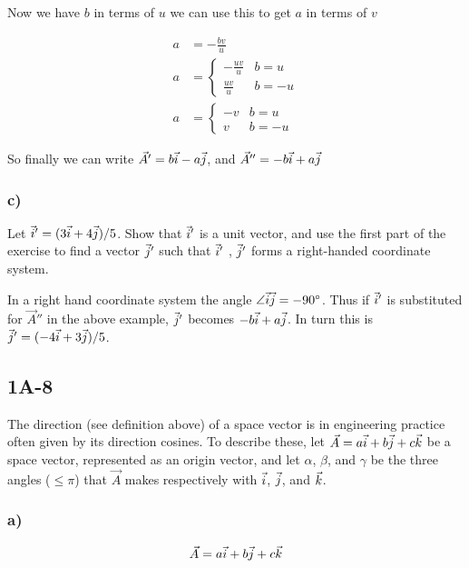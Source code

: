 Now we have $b$ in terms of $u$ we can use this to get $a$ in terms 
of $v$

\begin{align*}
a &= -\frac{bv}{u}\\
a &= \begin{cases} 
      -\frac{uv}{u} & b= u \\
      \frac{uv}{u} & b= -u
   \end{cases}\\
a &= \begin{cases} 
      -v & b= u \\
      v & b= -u
   \end{cases}
\end{align*}

So finally we can write $\vec{A}' = b\vec{i} - a\vec{j}$, and $\vec{A}'' = -b
\vec{i} + a\vec{j}$


\subsubsection*{c)} 
Let $\vec{i}' =(3\vec{i} +4\vec{j})/5$. Show that $\vec{i}'$ 
is a unit vector, and use the first part of the exercise to find a vector $
\vec{j}'$ such that $\vec{i}'$ , $\vec{j}'$ forms a right-handed coordinate system. 

In a right hand coordinate system the angle $\angle\vec{i}\vec{j} = \ang{-90}$.
Thus if $\vec{i}'$ is substituted for $\vec{A}''$ in the above example, $
\vec{j}'$ becomes $-b\vec{i} + a\vec{j}$.
In turn this is $\vec{j}' = (-4\vec{i} + 3\vec{j})/5$.

\subsection*{1A-8}

The direction (see definition above) of a space vector is in 
engineering practice often given by its direction cosines. To 
describe these, let $\vec{A} = a\vec{i} + b\vec{j} + c\vec{k}$ be a space 
vector, represented as an origin vector, and let $\alpha$, $\beta$, 
and $\gamma$ be the three angles ($\leq\pi$) that $\vec{A}$ makes 
respectively with $\vec{i}$, $\vec{j}$, and $\vec{k}$. 

\subsubsection*{a)}

\begin{equation*}
\vec{A} = a\vec{i} + b\vec{j} +c\vec{k}
\end{equation*}

